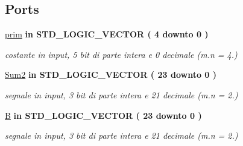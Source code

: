 \subsection*{Ports}
 \begin{DoxyCompactItemize}
\item 
\hyperlink{group___linear_regression_ga6b9afe9c48db695b7336519281c099a8}{prim}  {\bfseries {\bfseries \textcolor{vhdlchar}{in}\textcolor{vhdlchar}{ }}} {\bfseries \textcolor{vhdlchar}{S\+T\+D\+\_\+\+L\+O\+G\+I\+C\+\_\+\+V\+E\+C\+T\+OR}\textcolor{vhdlchar}{ }\textcolor{vhdlchar}{(}\textcolor{vhdlchar}{ }\textcolor{vhdlchar}{ } \textcolor{vhdldigit}{4} \textcolor{vhdlchar}{ }\textcolor{vhdlchar}{downto}\textcolor{vhdlchar}{ }\textcolor{vhdlchar}{ } \textcolor{vhdldigit}{0} \textcolor{vhdlchar}{ }\textcolor{vhdlchar}{)}\textcolor{vhdlchar}{ }} 
\begin{DoxyCompactList}\small\item\em costante in input, 5 bit di parte intera e 0 decimale (m.\+n = 4.) \end{DoxyCompactList}\item 
\hyperlink{group___linear_regression_ga4c98819455589b84c5e250a97e9bdfa1}{Sum2}  {\bfseries {\bfseries \textcolor{vhdlchar}{in}\textcolor{vhdlchar}{ }}} {\bfseries \textcolor{vhdlchar}{S\+T\+D\+\_\+\+L\+O\+G\+I\+C\+\_\+\+V\+E\+C\+T\+OR}\textcolor{vhdlchar}{ }\textcolor{vhdlchar}{(}\textcolor{vhdlchar}{ }\textcolor{vhdlchar}{ } \textcolor{vhdldigit}{23} \textcolor{vhdlchar}{ }\textcolor{vhdlchar}{downto}\textcolor{vhdlchar}{ }\textcolor{vhdlchar}{ } \textcolor{vhdldigit}{0} \textcolor{vhdlchar}{ }\textcolor{vhdlchar}{)}\textcolor{vhdlchar}{ }} 
\begin{DoxyCompactList}\small\item\em segnale in input, 3 bit di parte intera e 21 decimale (m.\+n = 2.) \end{DoxyCompactList}\item 
\hyperlink{group___linear_regression_gab6685be06ffd9f2425d01307287a4454}{B}  {\bfseries {\bfseries \textcolor{vhdlchar}{in}\textcolor{vhdlchar}{ }}} {\bfseries \textcolor{vhdlchar}{S\+T\+D\+\_\+\+L\+O\+G\+I\+C\+\_\+\+V\+E\+C\+T\+OR}\textcolor{vhdlchar}{ }\textcolor{vhdlchar}{(}\textcolor{vhdlchar}{ }\textcolor{vhdlchar}{ } \textcolor{vhdldigit}{23} \textcolor{vhdlchar}{ }\textcolor{vhdlchar}{downto}\textcolor{vhdlchar}{ }\textcolor{vhdlchar}{ } \textcolor{vhdldigit}{0} \textcolor{vhdlchar}{ }\textcolor{vhdlchar}{)}\textcolor{vhdlchar}{ }} 
\begin{DoxyCompactList}\small\item\em segnale in input, 3 bit di parte intera e 21 decimale (m.\+n = 2.) \end{DoxyCompactList}\item 

\end{DoxyCompactItemize}
